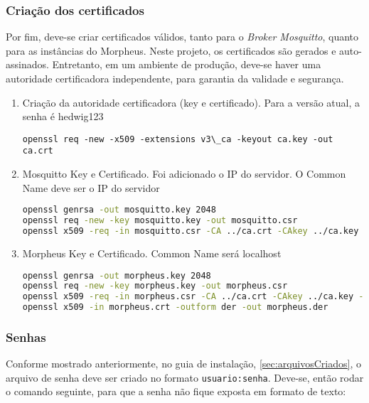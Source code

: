 \subsubsection{Criação dos certificados}

Por fim, deve-se criar certificados válidos, tanto para o \emph{Broker Mosquitto}, quanto para as instâncias do Morpheus. Neste projeto, os certificados são gerados e auto-assinados. Entretanto, em um ambiente de produção, deve-se haver uma autoridade certificadora independente, para garantia da validade e segurança.

\begin{enumerate}
\item
Criação da autoridade certificadora (key e certificado). Para a versão atual, a senha é hedwig123

\lstinline{openssl req -new -x509 -extensions v3\_ca -keyout ca.key -out ca.crt}
\item
Mosquitto Key e Certificado. Foi adicionado o IP do servidor. O Common Name deve ser o IP do servidor

\begin{lstlisting}[language=bash]
openssl genrsa -out mosquitto.key 2048
openssl req -new -key mosquitto.key -out mosquitto.csr
openssl x509 -req -in mosquitto.csr -CA ../ca.crt -CAkey ../ca.key -CAcreateserial -out mosquitto.crt -days 3650 -sha256
\end{lstlisting}

\item
Morpheus Key e Certificado. Common Name será localhost

\begin{lstlisting}[language=bash]
openssl genrsa -out morpheus.key 2048
openssl req -new -key morpheus.key -out morpheus.csr
openssl x509 -req -in morpheus.csr -CA ../ca.crt -CAkey ../ca.key -CAcreateserial -out morpheus.crt -days 3650 -sha256 -addtrust clientAuth
openssl x509 -in morpheus.crt -outform der -out morpheus.der
\end{lstlisting}
\end{enumerate}

\subsubsection{Senhas}

Conforme mostrado anteriormente, no guia de instalação, \ref{sec:arquivosCriados}, o arquivo de senha deve ser criado no formato \lstinline{usuario:senha}. Deve-se, então rodar o comando seguinte, para que a senha não fique exposta em formato de texto:

